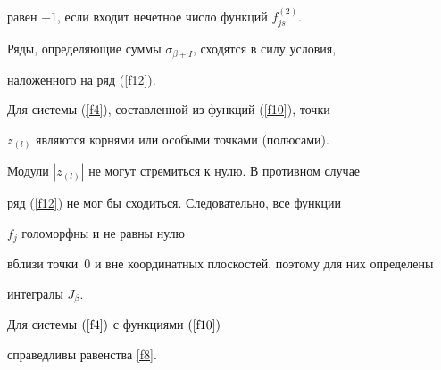 равен $-1$, если входит нечетное число функций $f^{(2)}_{js}$.





Ряды, определяющие суммы $\sigma_{\beta+I}$, сходятся в силу условия,


наложенного на ряд (\ref{f12}).





Для системы (\ref{f4}), составленной из функций (\ref{f10}), точки


$z_{(l)}$ являются корнями или особыми точками (полюсами). 


Модули $|z_{(l)}|$ не могут стремиться к нулю. В противном случае


ряд (\ref{f12}) не мог бы сходиться. Следовательно, все функции


$f_j$ голоморфны и не равны нулю


вблизи точки~0 и вне координатных плоскостей, поэтому для них определены


интегралы $J_\beta$.








\begin{thm}\label{t3}


Для системы $(\ref{f4})$ с функциями $(\ref{f10})$


справедливы равенства \eqref{f8}.


\end{thm}








